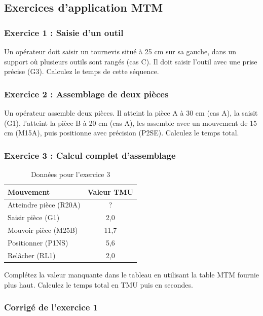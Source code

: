 \documentclass[a4paper,12pt]{article}
\begin{document}
\subsection{Exercices d'application MTM}

\subsubsection{Exercice 1 : Saisie d'un outil}

Un opérateur doit saisir un tournevis situé à 25 cm sur sa gauche, dans un support où plusieurs outils sont rangés (cas C). Il doit saisir l'outil avec une prise précise (G3). Calculez le temps de cette séquence.

\subsubsection{Exercice 2 : Assemblage de deux pièces}

Un opérateur assemble deux pièces. Il atteint la pièce A à 30 cm (cas A), la saisit (G1), l'atteint la pièce B à 20 cm (cas A), les assemble avec un mouvement de 15 cm (M15A), puis positionne avec précision (P2SE). Calculez le temps total.

\subsubsection{Exercice 3 : Calcul complet d'assemblage}

\begin{table}[ht]
\centering
\begin{tabular}{|l|c|}
\hline
\textbf{Mouvement} & \textbf{Valeur TMU} \\
\hline
Atteindre pièce (R20A) & ? \\
Saisir pièce (G1) & 2,0 \\
Mouvoir pièce (M25B) & 11,7 \\
Positionner (P1NS) & 5,6 \\
Relâcher (RL1) & 2,0 \\
\hline
\end{tabular}
\caption{Données pour l'exercice 3}
\end{table}

Complétez la valeur manquante dans le tableau en utilisant la table MTM fournie plus haut. Calculez le temps total en TMU puis en secondes.

\subsubsection{Corrigé de l'exercice 1}
\end{document}

